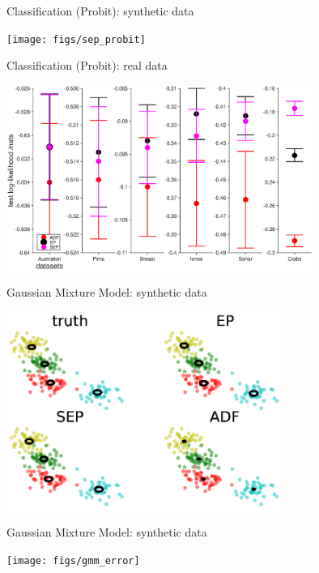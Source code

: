 \documentclass[mathserif]{beamer}
\begin{document}
\begin{frame}{Classification (Probit): synthetic data }
  \begin{overprint}
   \centerline{\texttt{[image: figs/sep\_probit]}}
 \end{overprint}
\end{frame}


\begin{frame}{Classification (Probit): real data }
  \begin{overprint}
   \centerline{\includegraphics[width=10cm]{figs/sep_probit_real_data}}
  \end{overprint}
\end{frame}


\begin{frame}{Gaussian Mixture Model: synthetic data }
  \begin{overprint}
   \centerline{\includegraphics[width=9cm]{figs/gmm1}}
  \end{overprint}
  
\end{frame}
\begin{frame}{Gaussian Mixture Model: synthetic data }
  \begin{overprint}
   \centerline{\texttt{[image: figs/gmm\_error]}}
  \end{overprint}
\end{frame}
\end{document}
